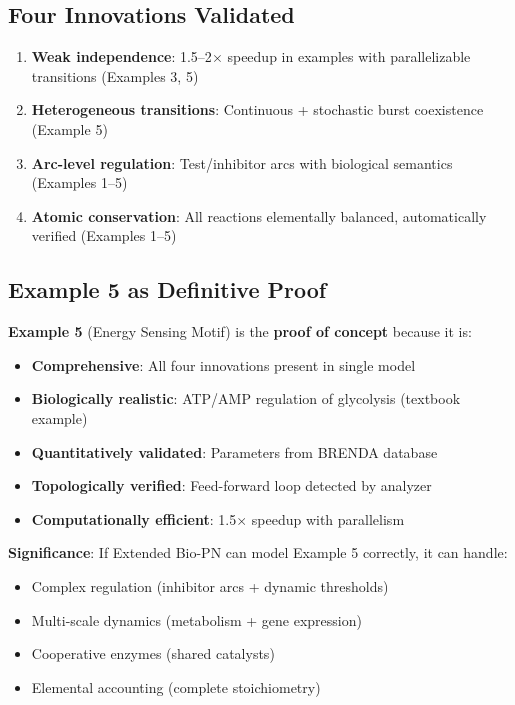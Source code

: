 \subsection{Four Innovations Validated}
\label{subsec:innovations-validated}

\begin{enumerate}
    \item \checkmark \textbf{Weak independence}: 1.5--2$\times$ speedup in examples with parallelizable transitions (Examples 3, 5)
    \item \checkmark \textbf{Heterogeneous transitions}: Continuous + stochastic burst coexistence (Example 5)
    \item \checkmark \textbf{Arc-level regulation}: Test/inhibitor arcs with biological semantics (Examples 1--5)
    \item \checkmark \textbf{Atomic conservation}: All reactions elementally balanced, automatically verified (Examples 1--5)
\end{enumerate}

\subsection{Example 5 as Definitive Proof}
\label{subsec:example5-proof}

\textbf{Example 5} (Energy Sensing Motif) is the \textbf{proof of concept} because it is:

\begin{itemize}
    \item \textbf{Comprehensive}: All four innovations present in single model
    \item \textbf{Biologically realistic}: ATP/AMP regulation of glycolysis (textbook example)
    \item \textbf{Quantitatively validated}: Parameters from BRENDA database
    \item \textbf{Topologically verified}: Feed-forward loop detected by analyzer
    \item \textbf{Computationally efficient}: 1.5$\times$ speedup with parallelism
\end{itemize}

\textbf{Significance}: If Extended Bio-PN can model Example 5 correctly, it can handle:

\begin{itemize}
    \item Complex regulation (inhibitor arcs + dynamic thresholds)
    \item Multi-scale dynamics (metabolism + gene expression)
    \item Cooperative enzymes (shared catalysts)
    \item Elemental accounting (complete stoichiometry)
\end{itemize}

